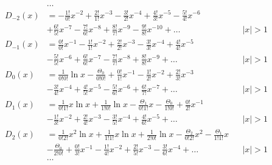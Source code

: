 \begin{equation*} \begin{aligned}
&\ldots \\
%
D_{-2}(x) &= 
- \frac{1!}{0!} x^{-2}
+ \frac{2!}{1!} x^{-3}
- \frac{3!}{2!} x^{-4}
+ \frac{4!}{3!} x^{-5}
- \frac{5!}{4!} x^{-6} \\ &
+ \frac{6!}{5!} x^{-7}
- \frac{7!}{6!} x^{-8}
+ \frac{8!}{7!} x^{-9}
- \frac{9!}{8!} x^{-10}
+ \ldots & 
&|x| > 1 \\
%
D_{-1}(x) &=  
  \frac{0!}{0!} x^{-1}
- \frac{1!}{1!} x^{-2}
+ \frac{2!}{2!} x^{-3}
- \frac{3!}{3!} x^{-4}
+ \frac{4!}{4!} x^{-5} \\ &
- \frac{5!}{5!} x^{-6}
+ \frac{6!}{6!} x^{-7}
- \frac{7!}{7!} x^{-8}
+ \frac{8!}{8!} x^{-9}
+ \ldots & 
&|x| > 1 \\
%
D_0(x) &=
  \frac{1}{0!0!} \ln{x}
- \frac{\Theta_0}{0!0!}
+ \frac{0!}{1!} x^{-1} 
- \frac{1!}{2!} x^{-2}
+ \frac{2!}{3!} x^{-3} \\ &
- \frac{3!}{4!} x^{-4}
+ \frac{4!}{5!} x^{-5}
- \frac{5!}{6!} x^{-6}
+ \frac{6!}{7!} x^{-7}
+ \ldots & 
&|x| > 1 \\
%
D_1(x) &=
  \frac{1}{0!1!} x \ln{x}
+ \frac{1}{1!0!} \ln{x}
- \frac{\Theta_1}{0!1!} x
- \frac{\Theta_0}{1!0!}
+ \frac{0!}{2!} x^{-1} \\ &
- \frac{1!}{3!} x^{-2}
+ \frac{2!}{4!} x^{-3}
- \frac{3!}{5!} x^{-4}
+ \frac{4!}{6!} x^{-5}
+ \ldots & 
&|x| > 1 \\
%
D_2(x) &=
  \frac{1}{0!2!} x^2 \ln{x}
+ \frac{1}{1!1!} x \ln{x}
+ \frac{1}{2!0!} \ln{x}
- \frac{\Theta_2}{0!2!} x^2
- \frac{\Theta_1}{1!1!} x \\ &
- \frac{\Theta_0}{2!0!}
+ \frac{0!}{3!} x^{-1}
- \frac{1!}{4!} x^{-2}
+ \frac{2!}{5!} x^{-3}
- \frac{3!}{6!} x^{-4}
+ \ldots & 
&|x| > 1 \\
%
&\ldots \\
\end{aligned} \end{equation*}
%
